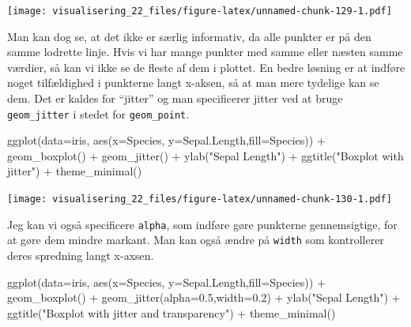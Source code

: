 \documentclass[
]{book}
\newenvironment{Shaded}{\begin{snugshade}}{\end{snugshade}}
\newcommand{\AttributeTok}[1]{\textcolor[rgb]{0.77,0.63,0.00}{#1}}
\newcommand{\FloatTok}[1]{\textcolor[rgb]{0.00,0.00,0.81}{#1}}
\newcommand{\FunctionTok}[1]{\textcolor[rgb]{0.00,0.00,0.00}{#1}}
\newcommand{\NormalTok}[1]{#1}
\newcommand{\SpecialCharTok}[1]{\textcolor[rgb]{0.00,0.00,0.00}{#1}}
\newcommand{\StringTok}[1]{\textcolor[rgb]{0.31,0.60,0.02}{#1}}
\begin{document}
\texttt{[image: visualisering\_22\_files/figure-latex/unnamed-chunk-129-1.pdf]}

Man kan dog se, at det ikke er særlig informativ, da alle punkter er på den samme lodrette linje. Hvis vi har mange punkter med samme eller næsten samme værdier, så kan vi ikke se de fleste af dem i plottet. En bedre løsning er at indføre noget tilfældighed i punkterne langt x-aksen, så at man mere tydelige kan se dem. Det er kaldes for ``jitter'' og man specificerer jitter ved at bruge \texttt{geom\_jitter} i stedet for \texttt{geom\_point}.

\begin{Shaded}
\begin{Highlighting}[]
\FunctionTok{ggplot}\NormalTok{(}\AttributeTok{data=}\NormalTok{iris, }\FunctionTok{aes}\NormalTok{(}\AttributeTok{x=}\NormalTok{Species, }\AttributeTok{y=}\NormalTok{Sepal.Length,}\AttributeTok{fill=}\NormalTok{Species)) }\SpecialCharTok{+} 
  \FunctionTok{geom\_boxplot}\NormalTok{() }\SpecialCharTok{+} 
  \FunctionTok{geom\_jitter}\NormalTok{() }\SpecialCharTok{+}
  \FunctionTok{ylab}\NormalTok{(}\StringTok{"Sepal Length"}\NormalTok{) }\SpecialCharTok{+} 
  \FunctionTok{ggtitle}\NormalTok{(}\StringTok{"Boxplot with jitter"}\NormalTok{) }\SpecialCharTok{+} 
  \FunctionTok{theme\_minimal}\NormalTok{()}
\end{Highlighting}
\end{Shaded}

\texttt{[image: visualisering\_22\_files/figure-latex/unnamed-chunk-130-1.pdf]}

Jeg kan vi også specificere \texttt{alpha}, som indføre gøre punkterne gennemsigtige, for at gøre dem mindre markant. Man kan også ændre på \texttt{width} som kontrollerer deres spredning langt x-axsen.

\begin{Shaded}
\begin{Highlighting}[]
\FunctionTok{ggplot}\NormalTok{(}\AttributeTok{data=}\NormalTok{iris, }\FunctionTok{aes}\NormalTok{(}\AttributeTok{x=}\NormalTok{Species, }\AttributeTok{y=}\NormalTok{Sepal.Length,}\AttributeTok{fill=}\NormalTok{Species)) }\SpecialCharTok{+} 
  \FunctionTok{geom\_boxplot}\NormalTok{() }\SpecialCharTok{+} 
  \FunctionTok{geom\_jitter}\NormalTok{(}\AttributeTok{alpha=}\FloatTok{0.5}\NormalTok{,}\AttributeTok{width=}\FloatTok{0.2}\NormalTok{) }\SpecialCharTok{+}
  \FunctionTok{ylab}\NormalTok{(}\StringTok{"Sepal Length"}\NormalTok{) }\SpecialCharTok{+} 
  \FunctionTok{ggtitle}\NormalTok{(}\StringTok{"Boxplot with jitter and transparency"}\NormalTok{) }\SpecialCharTok{+} 
  \FunctionTok{theme\_minimal}\NormalTok{()}
\end{Highlighting}
\end{Shaded}
\end{document}
